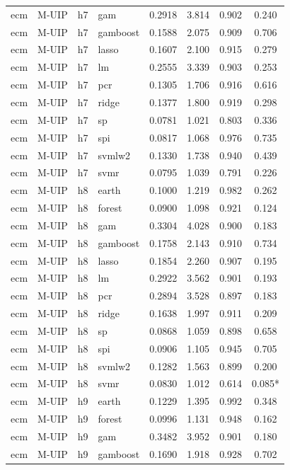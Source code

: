 \begin{ThreePartTable}
\begin{longtable}[t]{llclcccc}
ecm & M-UIP & h7 & gam & 0.2918 & 3.814 & 0.902 & 0.240\\
ecm & M-UIP & h7 & gamboost & 0.1588 & 2.075 & 0.909 & 0.706\\
ecm & M-UIP & h7 & lasso & 0.1607 & 2.100 & 0.915 & 0.279\\
ecm & M-UIP & h7 & lm & 0.2555 & 3.339 & 0.903 & 0.253\\
ecm & M-UIP & h7 & pcr & 0.1305 & 1.706 & 0.916 & 0.616\\
ecm & M-UIP & h7 & ridge & 0.1377 & 1.800 & 0.919 & 0.298\\
ecm & M-UIP & h7 & sp & 0.0781 & 1.021 & 0.803 & 0.336\\
ecm & M-UIP & h7 & spi & 0.0817 & 1.068 & 0.976 & 0.735\\
ecm & M-UIP & h7 & svmlw2 & 0.1330 & 1.738 & 0.940 & 0.439\\
ecm & M-UIP & h7 & svmr & 0.0795 & 1.039 & 0.791 & 0.226\\
\addlinespace
ecm & M-UIP & h8 & earth & 0.1000 & 1.219 & 0.982 & 0.262\\
ecm & M-UIP & h8 & forest & 0.0900 & 1.098 & 0.921 & 0.124\\
ecm & M-UIP & h8 & gam & 0.3304 & 4.028 & 0.900 & 0.183\\
ecm & M-UIP & h8 & gamboost & 0.1758 & 2.143 & 0.910 & 0.734\\
ecm & M-UIP & h8 & lasso & 0.1854 & 2.260 & 0.907 & 0.195\\
ecm & M-UIP & h8 & lm & 0.2922 & 3.562 & 0.901 & 0.193\\
ecm & M-UIP & h8 & pcr & 0.2894 & 3.528 & 0.897 & 0.183\\
ecm & M-UIP & h8 & ridge & 0.1638 & 1.997 & 0.911 & 0.209\\
ecm & M-UIP & h8 & sp & 0.0868 & 1.059 & 0.898 & 0.658\\
ecm & M-UIP & h8 & spi & 0.0906 & 1.105 & 0.945 & 0.705\\
ecm & M-UIP & h8 & svmlw2 & 0.1282 & 1.563 & 0.899 & 0.200\\
ecm & M-UIP & h8 & svmr & 0.0830 & 1.012 & 0.614 & 0.085*\\
\addlinespace
ecm & M-UIP & h9 & earth & 0.1229 & 1.395 & 0.992 & 0.348\\
ecm & M-UIP & h9 & forest & 0.0996 & 1.131 & 0.948 & 0.162\\
ecm & M-UIP & h9 & gam & 0.3482 & 3.952 & 0.901 & 0.180\\
ecm & M-UIP & h9 & gamboost & 0.1690 & 1.918 & 0.928 & 0.702\\

\end{longtable}
\end{ThreePartTable}
